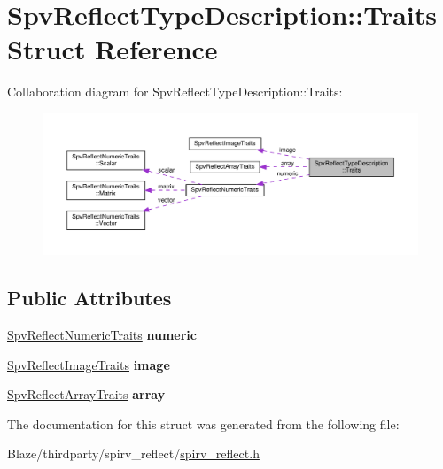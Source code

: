 \hypertarget{structSpvReflectTypeDescription_1_1Traits}{}\section{Spv\+Reflect\+Type\+Description\+:\+:Traits Struct Reference}
\label{structSpvReflectTypeDescription_1_1Traits}


Collaboration diagram for Spv\+Reflect\+Type\+Description\+:\+:Traits\+:\nopagebreak
\begin{figure}[H]
\begin{center}
\leavevmode
\includegraphics[width=350pt]{structSpvReflectTypeDescription_1_1Traits__coll__graph}
\end{center}
\end{figure}
\subsection*{Public Attributes}
\begin{DoxyCompactItemize}
\item 
\mbox{\label{structSpvReflectTypeDescription_1_1Traits_a7a278dc00f895f8d39828c53add35184}} 
\hyperlink{structSpvReflectNumericTraits}{Spv\+Reflect\+Numeric\+Traits} {\bfseries numeric}
\item 
\mbox{\label{structSpvReflectTypeDescription_1_1Traits_a2e586f1eb6324107eb0fe038b902116b}} 
\hyperlink{structSpvReflectImageTraits}{Spv\+Reflect\+Image\+Traits} {\bfseries image}
\item 
\mbox{\label{structSpvReflectTypeDescription_1_1Traits_a90f2b691da87a25b24ff87f189624d7b}} 
\hyperlink{structSpvReflectArrayTraits}{Spv\+Reflect\+Array\+Traits} {\bfseries array}
\end{DoxyCompactItemize}


The documentation for this struct was generated from the following file\+:\begin{DoxyCompactItemize}
\item 
Blaze/thirdparty/spirv\+\_\+reflect/\hyperlink{spirv__reflect_8h}{spirv\+\_\+reflect.\+h}\end{DoxyCompactItemize}
